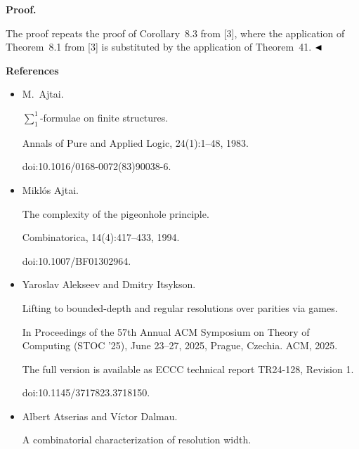 \par\medskip\noindent\textbf{Proof.}\par


The proof repeats the proof of Corollary 8.3 from [3], where the application of Theorem 8.1 from [3] is substituted by the application of Theorem 41.
$\hfill\blacktriangleleft$\par


\par\medskip\noindent\textbf{References}\par

\begin{itemize}


\item 
[1]

M. Ajtai.


$\sum_{1}^{1}$-formulae on finite structures.


Annals of Pure and Applied Logic, 24(1):1–48, 1983.


doi:10.1016/0168-0072(83)90038-6.





\item 
[2]

Miklós Ajtai.


The complexity of the pigeonhole principle.


Combinatorica, 14(4):417–433, 1994.


doi:10.1007/BF01302964.





\item 
[3]

Yaroslav Alekseev and Dmitry Itsykson.


Lifting to bounded-depth and regular resolutions over parities via
games.


In Proceedings of the 57th Annual ACM Symposium on Theory of
Computing (STOC ’25), June 23–27, 2025, Prague, Czechia. ACM, 2025.


The full version is available as ECCC technical report TR24-128,
Revision 1.


doi:10.1145/3717823.3718150.





\item 
[4]

Albert Atserias and Víctor Dalmau.


A combinatorial characterization of resolution width.



\end{itemize}
